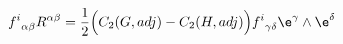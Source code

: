 \begin{equation}
{f^i}_{\alpha\beta}R^{\alpha\beta}={1\over 2}
\Bigl( C_2(G,adj) - C_2(H,adj)\Bigr)
{f^i}_{\gamma\delta}\e^\gamma\wedge\e^\delta 
\end{equation}

